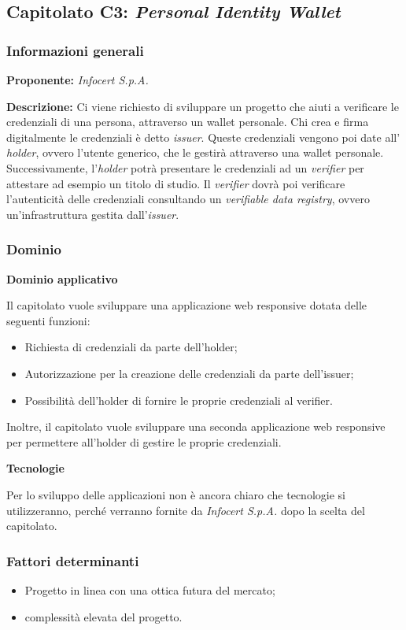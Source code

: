 \subsection{Capitolato C3: \textit{Personal Identity Wallet}}
\subsubsection{Informazioni generali}
\textbf{Proponente:} \textit{Infocert S.p.A.}

\textbf{Descrizione:} Ci viene richiesto di sviluppare un progetto che aiuti a verificare le credenziali di una persona, attraverso un wallet personale.
Chi crea e firma digitalmente le credenziali è detto \textit{issuer}. Queste credenziali vengono poi date all' \textit{holder}, ovvero l'utente generico, che le gestirà attraverso una wallet personale.
Successivamente, l'\textit{holder} potrà presentare le credenziali ad un \textit{verifier} per attestare ad esempio un titolo di studio.
Il \textit{verifier} dovrà poi verificare l'autenticità delle credenziali consultando un \textit{verifiable data registry}, ovvero un'infrastruttura gestita dall'\textit{issuer}.

\subsubsection{Dominio}
\textbf{Dominio applicativo}

Il capitolato vuole sviluppare una applicazione web responsive dotata delle seguenti funzioni:
\begin{itemize}
    \item Richiesta di credenziali da parte dell'holder;
    \item Autorizzazione per la creazione delle credenziali da parte dell'issuer;
    \item Possibilità dell'holder di fornire le proprie credenziali al verifier.
\end{itemize}
Inoltre, il capitolato vuole sviluppare una seconda applicazione web responsive per permettere all'holder di gestire le proprie credenziali.

\textbf{Tecnologie}

Per lo sviluppo delle applicazioni non è ancora chiaro che tecnologie si utilizzeranno, perché verranno fornite da \textit{Infocert S.p.A.} dopo la scelta del capitolato.

\subsubsection{Fattori determinanti}
\begin{itemize}
    \item Progetto in linea con una ottica futura del mercato;
    \item complessità elevata del progetto.
\end{itemize}
